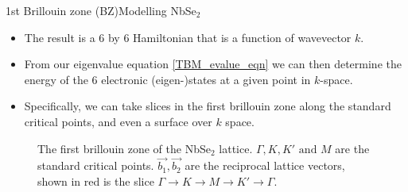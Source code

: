 \documentclass[9pt]{beamer}
\begin{document}
\begin{frame}{1st Brillouin zone (BZ)}{Modelling NbSe$_2$}
  \begin{itemize}
    \item The result is a 6 by 6 Hamiltonian that is a function of wavevector $k$.

    \item From our eigenvalue equation \eqref{TBM_evalue_eqn} we can then determine the energy of the 6 electronic (eigen-)states at a given point in $k$-space.

    \item Specifically, we can take slices in the first brillouin zone along the standard critical points, and even a surface over $k$ space.
  \end{itemize}

  \begin{figure}
    \centering
    \caption{The first brillouin zone of the NbSe$_2$ lattice. $\Gamma, K, K' \text{ and } M$ are the standard critical points. $\vec{b_1}, \vec{b_2}$ are the reciprocal lattice vectors, shown in red is the slice $\Gamma \rightarrow K \rightarrow M \rightarrow K' \rightarrow \Gamma$.}
  \end{figure}
\end{frame}
\end{document}
